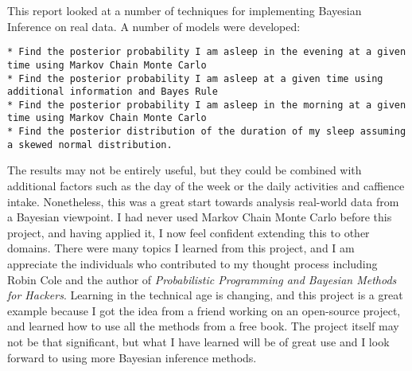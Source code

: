 \documentclass[12pt]{article}
\begin{document}
This report looked at a number of techniques for implementing Bayesian
Inference on real data. A number of models were developed:

\begin{verbatim}
* Find the posterior probability I am asleep in the evening at a given time using Markov Chain Monte Carlo
* Find the posterior probability I am asleep at a given time using additional information and Bayes Rule
* Find the posterior probability I am asleep in the morning at a given time using Markov Chain Monte Carlo
* Find the posterior distribution of the duration of my sleep assuming a skewed normal distribution. 
\end{verbatim}

The results may not be entirely useful, but they could be combined with
additional factors such as the day of the week or the daily activities
and caffience intake. Nonetheless, this was a great start towards
analysis real-world data from a Bayesian viewpoint. I had never used
Markov Chain Monte Carlo before this project, and having applied it, I
now feel confident extending this to other domains. There were many
topics I learned from this project, and I am appreciate the individuals
who contributed to my thought process including Robin Cole and the
author of \emph{Probabilistic Programming and Bayesian Methods for
Hackers}. Learning in the technical age is changing, and this project is
a great example because I got the idea from a friend working on an
open-source project, and learned how to use all the methods from a free
book. The project itself may not be that significant, but what I have
learned will be of great use and I look forward to using more Bayesian
inference methods.


        
    
\end{document}
